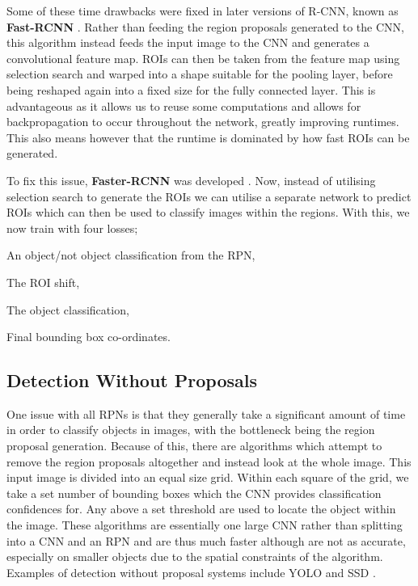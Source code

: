 Some of these time drawbacks were fixed in later versions of R-CNN, known as \textbf{Fast-RCNN} \cite{girshick_fast_2015}. Rather than feeding the region proposals generated to the CNN, this algorithm instead feeds the input image to the CNN and generates a convolutional feature map. ROIs can then be taken from the feature map using selection search and warped into a shape suitable for the pooling layer, before being reshaped again into a fixed size for the fully connected layer. This is advantageous as it allows us to reuse some computations and allows for backpropagation to occur throughout the network, greatly improving runtimes.  This also means however that the runtime is dominated by how fast ROIs can be generated. 

To fix this issue, \textbf{Faster-RCNN} was developed \cite{ren_faster_2015}. Now, instead of utilising selection search to generate the ROIs we can utilise a separate network to predict ROIs which can then be used to classify images within the regions. With this, we now train with four losses; 

\begin{enumerate*}
	\item An object/not object classification from the RPN,
	\item The ROI shift,
	\item The object classification,
	\item Final bounding box co-ordinates.
\end{enumerate*}

\subsection{Detection Without Proposals}\label{ch:Background,sec:objectDetection,sub:noProposals}

One issue with all RPNs is that they generally take a significant amount of time in order to classify objects in images, with the bottleneck being the region proposal generation. Because of this, there are algorithms which attempt to remove the region proposals altogether and instead look at the whole image. This input image is divided into an equal size grid. Within each square of the grid, we take a set number of bounding boxes which the CNN provides classification confidences for. Any above a set threshold are used to locate the object within the image. These algorithms are essentially one large CNN rather than splitting into a CNN and an RPN and are thus much faster although are not as accurate, especially on smaller objects due to the spatial constraints of the algorithm. Examples of detection without proposal systems include YOLO \cite{redmon_you_2016} and SSD \cite{liu_ssd:_2016}. 


